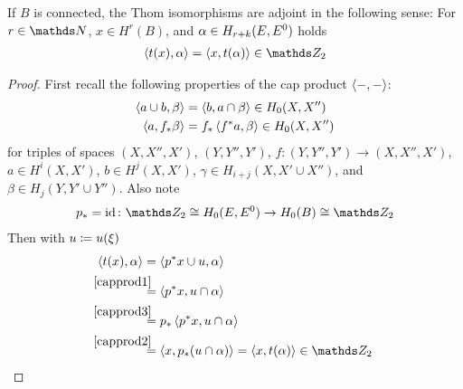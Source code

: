 \begin{Lem}\label{thomisoself-adjoint}
  If $B$ is connected, the Thom isomorphisms are adjoint in the
  following sense:
  For $r\in\Nat$, $x\in H^r(B)$,
  and $\alpha\in H_{r+k}(E, {E}^0)$  holds 
  \begin{gather*}
    \capped{t(x)}{\alpha} = \capped{x}{t(\alpha)} \in\Zmod2
  \end{gather*}
  \begin{proof}
    First recall the following properties of the cap product
    $\left\langle -, - \right\rangle$:
    \begin{align}
      \label{capprod1}
      \left\langle a\cup b, \beta \right\rangle &= \left\langle b, a\cap\beta \right\rangle
                                \in H_0(X,X'')\\
      \label{capprod2}
      \left\langle a, {f}_* \beta \right\rangle &= {f}_* \left\langle {f}^* a, \beta \right\rangle
                                \in H_0(X,X'')
    \end{align}
    for
    triples of spaces $(X, X'', X')$, $(Y, Y'', Y')$,
    $f\colon (Y,Y'',Y')\to (X,X'',X')$,
    $a\in H^i(X,X')$, $b\in H^j(X,X')$,
    $\gamma\in H_{i+j}(X, X'\cup X'')$,
    and
    $\beta\in H_j(Y, Y'\cup Y'')$.
    Also note
    \begin{gather}
      \label{capprod3}
      \pf p = \Id \colon
      \Zmod2\cong H_0(\thomspacepair{E})\to H_0(B)\cong\Zmod2
    \end{gather}
    Then with $u\coloneqq u(\xi)$
    \begin{align*}
      \capped{t(x)}{\alpha}
      &= \capped{\pb p x \cup \u}{\alpha} \\
      &\overset{\mathllap{\eqref{capprod1}}}=
        \capped{\pb p x}{\u\cap\alpha} \\
      &\overset{\mathllap{\eqref{capprod3}}}=
        \pf p\capped{\pb p x}{\u\cap\alpha} \\
      &\overset{\mathllap{\eqref{capprod2}}}=
        \capped{x}{\pf p(u\cap\alpha)}
        = \capped{x}{\thomiso (\alpha)} \in\Zmod2
    \end{align*}
  \end{proof}
\end{Lem}

